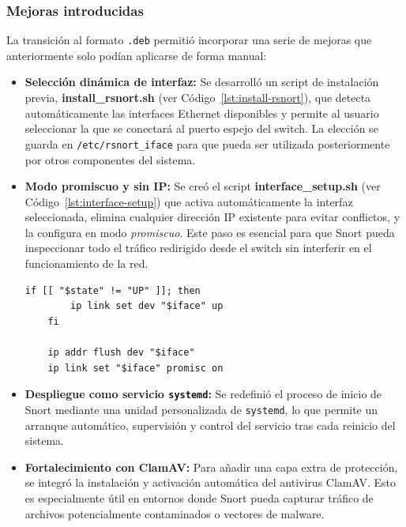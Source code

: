 \documentclass[11pt,a4paper,twoside]{report}
\begin{document}
\pagebreak

\subsubsection{Mejoras introducidas}

La transición al formato \texttt{.deb} permitió incorporar una serie de mejoras que anteriormente solo podían aplicarse de forma manual:

\begin{itemize}
	\item \textbf{Selección dinámica de interfaz:} Se desarrolló un script de instalación previa, \textbf{install\_rsnort.sh} (ver Código~\ref{lst:install-rsnort}), que detecta automáticamente las interfaces Ethernet disponibles y permite al usuario seleccionar la que se conectará al puerto espejo del switch. La elección se guarda en \texttt{/etc/rsnort\_iface} para que pueda ser utilizada posteriormente por otros componentes del sistema.
	
	\item \textbf{Modo promiscuo y sin IP:} Se creó el script \textbf{interface\_setup.sh} (ver Código~\ref{lst:interface-setup}) que activa automáticamente la interfaz seleccionada, elimina cualquier dirección IP existente para evitar conflictos, y la configura en modo \textit{promiscuo}. Este paso es esencial para que Snort pueda inspeccionar todo el tráfico redirigido desde el switch sin interferir en el funcionamiento de la red.
	
	\begin{lstlisting}[style=commandstyle, caption={Activación automática del modo promiscuo en interface\_setup.sh}, label=lst:promiscuo]
	if [[ "$state" != "UP" ]]; then
		ip link set dev "$iface" up
	fi
	
	ip addr flush dev "$iface"
	ip link set "$iface" promisc on
	\end{lstlisting}
	
	\item \textbf{Despliegue como servicio \texttt{systemd}:} Se redefinió el proceso de inicio de Snort mediante una unidad personalizada de \texttt{systemd}, lo que permite un arranque automático, supervisión y control del servicio tras cada reinicio del sistema.
	
	\item \textbf{Fortalecimiento con ClamAV:} Para añadir una capa extra de protección, se integró la instalación y activación automática del antivirus ClamAV. Esto es especialmente útil en entornos donde Snort pueda capturar tráfico de archivos potencialmente contaminados o vectores de malware.
\end{itemize}
\end{document}

